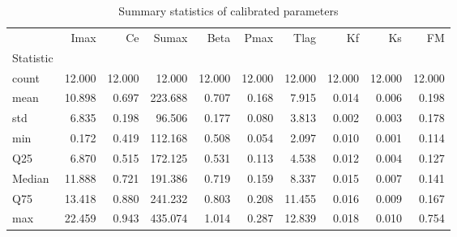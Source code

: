 \begin{table}
\caption{Summary statistics of calibrated parameters}
\label{tab:param_summary}
\begin{tabular}{lrrrrrrrrr}
\toprule
 & Imax & Ce & Sumax & Beta & Pmax & Tlag & Kf & Ks & FM \\
Statistic &  &  &  &  &  &  &  &  &  \\
\midrule
count & 12.000 & 12.000 & 12.000 & 12.000 & 12.000 & 12.000 & 12.000 & 12.000 & 12.000 \\
mean & 10.898 & 0.697 & 223.688 & 0.707 & 0.168 & 7.915 & 0.014 & 0.006 & 0.198 \\
std & 6.835 & 0.198 & 96.506 & 0.177 & 0.080 & 3.813 & 0.002 & 0.003 & 0.178 \\
min & 0.172 & 0.419 & 112.168 & 0.508 & 0.054 & 2.097 & 0.010 & 0.001 & 0.114 \\
Q25 & 6.870 & 0.515 & 172.125 & 0.531 & 0.113 & 4.538 & 0.012 & 0.004 & 0.127 \\
Median & 11.888 & 0.721 & 191.386 & 0.719 & 0.159 & 8.337 & 0.015 & 0.007 & 0.141 \\
Q75 & 13.418 & 0.880 & 241.232 & 0.803 & 0.208 & 11.455 & 0.016 & 0.009 & 0.167 \\
max & 22.459 & 0.943 & 435.074 & 1.014 & 0.287 & 12.839 & 0.018 & 0.010 & 0.754 \\
\bottomrule
\end{tabular}
\end{table}
